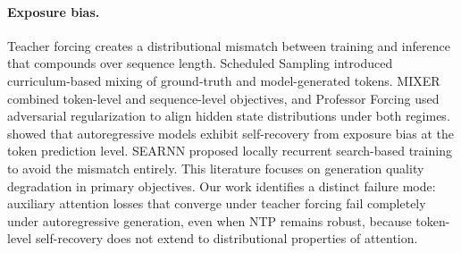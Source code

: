 \paragraph{Exposure bias.}
Teacher forcing creates a distributional mismatch between training and inference that compounds over sequence length. Scheduled Sampling \citep{bengio2015scheduled} introduced curriculum-based mixing of ground-truth and model-generated tokens. MIXER \citep{ranzato2016sequence} combined token-level and sequence-level objectives, and Professor Forcing \citep{lamb2016professor} used adversarial regularization to align hidden state distributions under both regimes. \citet{he2019exposure} showed that autoregressive models exhibit self-recovery from exposure bias at the token prediction level. SEARNN \citep{leblond2018searnn} proposed locally recurrent search-based training to avoid the mismatch entirely. This literature focuses on generation quality degradation in primary objectives. Our work identifies a distinct failure mode: auxiliary attention losses that converge under teacher forcing fail completely under autoregressive generation, even when NTP remains robust, because token-level self-recovery does not extend to distributional properties of attention.